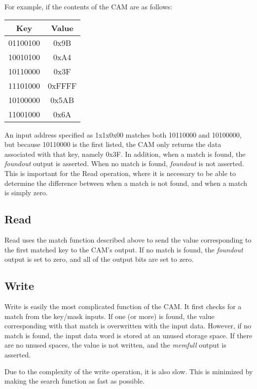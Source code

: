 \documentclass{article}
\begin{document}
  For example, if the contents of the CAM are as follows:

  \bigskip
  \begin{tabular}{ | c | c | }
  \hline
  {\bf Key} & {\bf Value} \\
  \hline
  01100100 & 0x9B \\
  \hline
  10010100 & 0xA4 \\
  \hline
  10110000 & 0x3F \\
  \hline
  11101000 & 0xFFFF \\
  \hline
  10100000 & 0x5AB \\
  \hline
  11001000 & 0x6A \\
  \hline
  \end{tabular}
  \bigskip

  An input address specified as 1x1x0x00 matches both 10110000 and 10100000,
  but because 10110000 is the first listed, the CAM only returns the data
  associated with that key, namely 0x3F.  In addition, when a match is found,
  the {\it foundout} output is asserted.  When no match is found, {\it foundout} is
  not asserted.  This is important for the Read operation, where it is necessary
  to be able to determine the difference between when a match is not found, and
  when a match is simply zero.

  \subsection{Read}

  Read uses the match function described above to send the value corresponding
  to the first matched key to the CAM's output.  If no match is found, the
  {\it foundout} output is set to zero, and all of the output bits are set to
  zero.

  \subsection{Write}

  Write is easily the most complicated function of the CAM.  It first checks for
  a match from the key/mask inputs.  If one (or more) is found, the value
  corresponding with that match is overwritten with the input data.  However,
  if no match is found, the input data word is stored at an unused storage
  space.  If there are no unused spaces, the value is not written, and the
  {\it memfull} output is asserted.

  Due to the complexity of the write operation, it is also slow.  This is
  minimized by making the search function as fast as possible.
\end{document}
